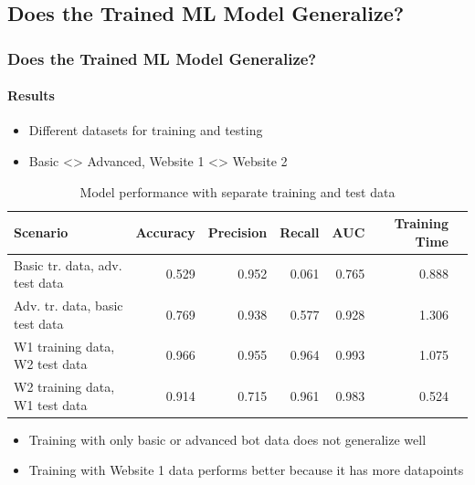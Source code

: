 \documentclass[t,aspectratio=169,table]{beamer}
\begin{document}
\subsection{Does the Trained ML Model Generalize?}
\begin{frame}
\frametitle{Does the Trained ML Model Generalize?}
\framesubtitle{Results}

\begin{itemize}
    \item Different datasets for training and testing
    \item Basic <> Advanced, Website 1 <> Website 2
\end{itemize}

\begin{table}[H]
    \begin{center}
        \begin{tabular*}{\textwidth}{l @{\extracolsep{\fill}} rrrrrr}
            Scenario & Accuracy & Precision & Recall & AUC & Training Time \\
            \midrule
            Basic tr. data, adv. test data & 0.529 & 0.952 & 0.061 & 0.765 & 0.888 \\
            Adv. tr. data, basic test data & 0.769 & 0.938 & 0.577 & 0.928 & 1.306 \\
            W1 training data, W2 test data & 0.966 & 0.955 & 0.964 & 0.993 & 1.075 \\
            W2 training data, W1 test data & 0.914 & 0.715 & 0.961 & 0.983 & 0.524 \\
        \end{tabular*}
    \end{center}
    \caption{Model performance with separate training and test data}
    \label{table:simple_vs_advanced_mouse_separate_train_test}
\end{table}

\begin{itemize}
    \item Training with only basic or advanced bot data does not generalize well
    \item Training with Website 1 data performs better because it has more datapoints
\end{itemize}

\end{frame}
\end{document}
